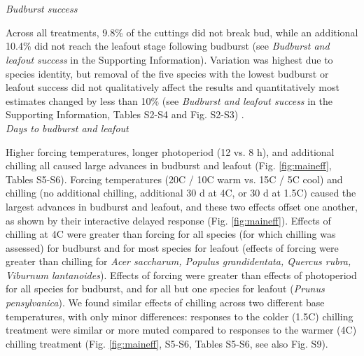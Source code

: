 \documentclass[11pt]{article}
\begin{document}
\vspace{2ex}\\
\vspace{2ex}\\
\emph{Budburst success}

\noindent Across all treatments, 9.8\% of the cuttings did not break bud, while an additional 10.4\% did not reach the leafout stage following budburst (see \emph{Budburst and leafout success} in the Supporting Information). Variation was highest due to species identity, but removal of the five species with the lowest  budburst or leafout success did not qualitatively affect the results and quantitatively most estimates changed by less than 10\% (see \emph{Budburst and leafout success} in the Supporting Information, Tables S2-S4 and Fig. S2-S3) . \\

\noindent \emph{Days to budburst and leafout}

Higher forcing temperatures, longer photoperiod (12 vs. 8 h), and additional chilling all caused large advances in budburst and leafout (Fig. \ref{fig:maineff}, Tables S5-S6). Forcing temperatures (20\degree C / 10\degree C warm vs. 15\degree C / 5\degree C cool) and chilling (no additional chilling,  additional 30 d at 4\degree C, or 30 d at 1.5\degree C) caused the largest advances in budburst and leafout, and these two effects offset one another, as shown by their interactive delayed response (Fig. \ref{fig:maineff}). Effects of chilling at 4\degree C were greater than forcing for all species (for which chilling was assessed) for budburst and for most species for leafout (effects of forcing were greater than chilling for \emph{Acer saccharum, Populus grandidentata, Quercus rubra, Viburnum lantanoides}). Effects of forcing were greater than effects of photoperiod for all species for budburst, and for all but one species for leafout (\emph{Prunus pensylvanica}). We found similar effects of chilling across two different base temperatures, with only minor differences: responses to the colder (1.5\degree C) chilling treatment were similar or more muted compared to responses to the warmer  (4\degree C) chilling treatment (Fig. \ref{fig:maineff}, S5-S6, Tables S5-S6, see also Fig. S9). 
\end{document}
